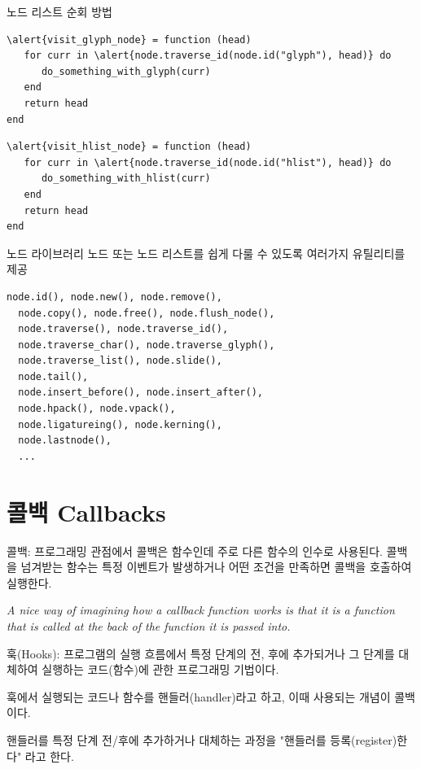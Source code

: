 \documentclass[t,10pt]{beamer}
\begin{document}
\begin{frame}[fragile]{노드 리스트 순회 방법}
\begin{Verbatim}[fontsize=\small,commandchars=\\\{\}]
\alert{visit_glyph_node} = function (head)
   for curr in \alert{node.traverse_id(node.id("glyph"), head)} do
      do_something_with_glyph(curr)
   end
   return head
end
\end{Verbatim}

\begin{Verbatim}[fontsize=\small,commandchars=\\\{\}]
\alert{visit_hlist_node} = function (head)
   for curr in \alert{node.traverse_id(node.id("hlist"), head)} do
      do_something_with_hlist(curr)
   end
   return head
end
\end{Verbatim}
\end{frame}

\begin{frame}[fragile]{노드 라이브러리}
  노드 또는 노드 리스트를 쉽게 다룰 수 있도록 여러가지 유틸리티를 제공

\begin{Verbatim}[fontsize=\small]
  node.id(), node.new(), node.remove(),
  node.copy(), node.free(), node.flush_node(),
  node.traverse(), node.traverse_id(),
  node.traverse_char(), node.traverse_glyph(),
  node.traverse_list(), node.slide(),
  node.tail(),
  node.insert_before(), node.insert_after(),
  node.hpack(), node.vpack(),
  node.ligatureing(), node.kerning(),
  node.lastnode(),
  ...
\end{Verbatim}
\end{frame}

\section{콜백 Callbacks}

\begin{frame}[fragile]{콜백: 프로그래밍 관점에서}
  콜백은 함수인데 주로 다른 함수의 인수로 사용된다. 콜백을 넘겨받는 함수는
  특정 이벤트가 발생하거나 어떤 조건을 만족하면 콜백을 호출하여 실행한다.

  \textit{A nice way of imagining how a callback function works is that it is a
  function that is \alert{called at the back} of the function it is
  passed into.}

  \alert{훅(Hooks)}: 프로그램의 실행 흐름에서 특정 단계의 전, 후에 추가되거나
  그 단계를 대체하여 실행하는 코드(함수)에 관한 프로그래밍 기법이다.

  훅에서 실행되는 코드나 함수를 \alert{핸들러(handler)}라고 하고, 이때 사용되는
  개념이 콜백이다.

  핸들러를 특정 단계 전/후에 추가하거나 대체하는 과정을 "\alert{핸들러를
    등록(register)한다}" 라고 한다.
\end{frame}
\end{document}
